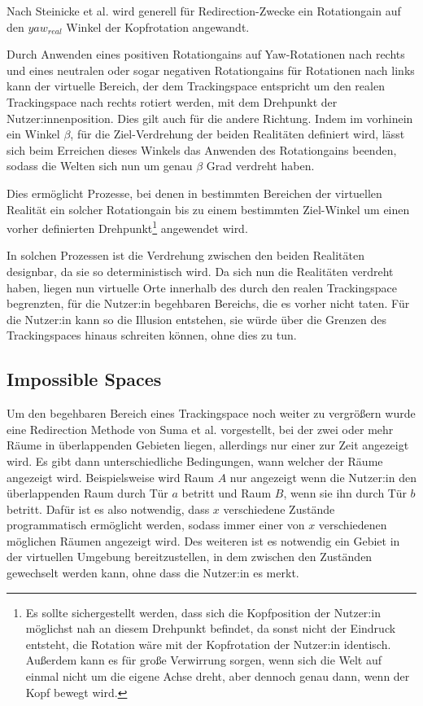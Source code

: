 Nach Steinicke et al. \cite{detection-thresholds} wird generell für Redirection-Zwecke ein Rotationgain auf den $yaw_{real}$ Winkel der Kopfrotation angewandt.

Durch Anwenden eines positiven Rotationgains auf Yaw-Rotationen nach rechts und eines neutralen oder sogar negativen Rotationgains für Rotationen nach links kann der virtuelle Bereich, der dem Trackingspace entspricht um den realen Trackingspace nach rechts rotiert werden, mit dem Drehpunkt der Nutzer:innenposition. Dies gilt auch für die andere Richtung. Indem im vorhinein ein Winkel $\beta$, für die Ziel-Verdrehung der beiden Realitäten definiert wird, lässt sich beim Erreichen dieses Winkels das Anwenden des Rotationgains beenden, sodass die Welten sich nun um genau $\beta$ Grad verdreht haben.

Dies ermöglicht Prozesse, bei denen in bestimmten Bereichen der virtuellen Realität ein solcher  Rotationgain bis zu einem bestimmten Ziel-Winkel um einen vorher definierten Drehpunkt\footnote{Es sollte sichergestellt werden, dass sich die Kopfposition der Nutzer:in möglichst nah an diesem Drehpunkt befindet, da sonst nicht der Eindruck entsteht, die Rotation wäre mit der Kopfrotation der Nutzer:in identisch. Außerdem kann es für große Verwirrung sorgen, wenn sich die Welt auf einmal nicht um die eigene Achse dreht, aber dennoch genau dann, wenn der Kopf bewegt wird.} angewendet wird.

In solchen Prozessen ist die Verdrehung zwischen den beiden Realitäten designbar, da sie so deterministisch wird. Da sich nun die Realitäten verdreht haben, liegen nun virtuelle Orte innerhalb des durch den realen Trackingspace begrenzten, für die Nutzer:in begehbaren Bereichs, die es vorher nicht taten.
Für die Nutzer:in kann so die Illusion entstehen, sie würde über die Grenzen des Trackingspaces hinaus schreiten können, ohne dies zu tun. %

\subsection{Impossible Spaces}
Um den begehbaren Bereich eines Trackingspace noch weiter zu vergrößern wurde eine Redirection Methode von Suma et al. \cite{impossible-spaces-suma} vorgestellt, bei der zwei oder mehr Räume in überlappenden Gebieten liegen, allerdings nur einer zur Zeit angezeigt wird. Es gibt dann unterschiedliche Bedingungen, wann welcher der Räume angezeigt wird. Beispielsweise wird Raum $A$ nur angezeigt wenn die Nutzer:in den überlappenden Raum durch Tür $a$ betritt und Raum $B$, wenn sie ihn durch Tür $b$ betritt.
Dafür ist es also notwendig, dass $x$ verschiedene Zustände programmatisch ermöglicht werden, sodass immer einer von $x$ verschiedenen möglichen Räumen angezeigt wird.
Des weiteren ist es notwendig ein Gebiet in der virtuellen Umgebung bereitzustellen, in dem zwischen den Zuständen gewechselt werden kann, ohne dass die Nutzer:in es merkt.

